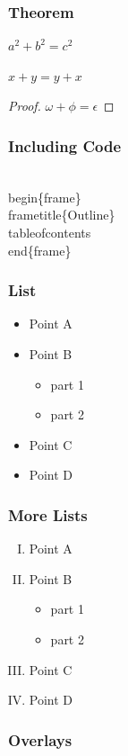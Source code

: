 \documentclass{beamer}
\begin{document}
\begin{frame}
\frametitle{Theorem}
\begin{theorem}[Pythagoras] 
  $ a^2 + b^2 = c^2$
  \end{theorem}
  \begin{corollary}
  $ x + y = y + x  $
  \end{corollary}
  \begin{proof}
  $\omega +\phi = \epsilon $
  \end{proof}
\end{frame}

\begin{frame}[fragile]
  \frametitle{Including Code}
  \begin{semiverbatim}
  \\begin\{frame\}
  \\frametitle\{Outline\}
  \\tableofcontents
  \\end\{frame\}
  \end{semiverbatim}
  \end{frame}

  \begin{frame}
    \frametitle{List}
    \begin{itemize}
    \pause
    \item Point A
    \pause
    \item Point B
    \begin{itemize}
    \pause
    \item part 1
    \pause
    \item part 2
    \end{itemize}
    \pause
    \item Point C
    \pause
    \item Point D
    \end{itemize}
    \end{frame}

    \begin{frame}
      \frametitle{More Lists}
      \begin{enumerate}[(I)]
      \item<1-> Point A
      \item<2-> Point B
      \begin{itemize}
      \item<3-> part 1
      \item<4-> part 2
      \end{itemize}
      \item<5-> Point C
      \item<6-> Point D
      \end{enumerate}
      \end{frame}
      \begin{frame}
        \frametitle{Overlays}
        
        
        \end{frame}
\end{document}

